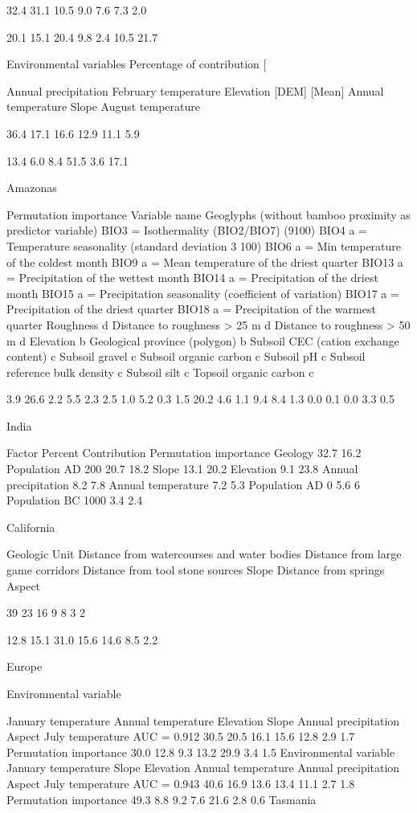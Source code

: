 \documentclass[a4paper,12pt]{scrartcl}
\begin{document}
32.4
31.1
10.5
9.0
7.6
7.3
2.0

20.1
15.1
20.4
9.8
2.4
10.5
21.7

Environmental variables Percentage of contribution [%

Annual precipitation
February temperature
Elevation [DEM]
[Mean] Annual temperature
Slope
August temperature

36.4
17.1
16.6
12.9
11.1
5.9

13.4
6.0
8.4
51.5
3.6
17.1

\cite{mcmichael2014bamboodominated}
Amazonas

Permutation importance
Variable name Geoglyphs (without bamboo proximity as predictor variable)
BIO3 = Isothermality (BIO2/BIO7) (9100)
BIO4 a = Temperature seasonality (standard deviation 3 100)
BIO6 a = Min temperature of the coldest month
BIO9 a = Mean temperature of the driest quarter
BIO13 a = Precipitation of the wettest month
BIO14 a = Precipitation of the driest month
BIO15 a = Precipitation seasonality (coefficient of variation)
BIO17 a = Precipitation of the driest quarter
BIO18 a = Precipitation of the warmest quarter
Roughness d
Distance to roughness > 25 m d
Distance to roughness > 50 m d
Elevation b
Geological province (polygon) b
Subsoil CEC (cation exchange content) c
Subsoil gravel c
Subsoil organic carbon c
Subsoil pH c
Subsoil reference bulk density c
Subsoil silt c
Topsoil organic carbon c

3.9
26.6
2.2
5.5
2.3
2.5
1.0
5.2
0.3
1.5
20.2
4.6
1.1
9.4
8.4
1.3
0.0
0.1
0.0
3.3
0.5

\parencite{gillespie2016predictive}
India

Factor Percent Contribution Permutation importance
Geology 32.7 16.2
Population AD 200 20.7 18.2
Slope 13.1 20.2
Elevation 9.1 23.8
Annual precipitation 8.2 7.8
Annual temperature 7.2 5.3
Population AD 0 5.6 6
Population BC 1000 3.4 2.4

\cite{oyarzun2016predicting}
California

Geologic Unit
Distance from watercourses and water bodies
Distance from large game corridors
Distance from tool stone sources
Slope
Distance from springs
Aspect

39%
23%
16%
9%
8%
3%
2%

12.8
15.1
31.0
15.6
14.6
8.5
2.2

\cite{kondo2018ecological}
Europe

Environmental variable

January temperature
Annual temperature
Elevation
Slope
Annual precipitation
Aspect
July temperature
AUC = 0.912
30.5
20.5
16.1
15.6
12.8
2.9
1.7
Permutation importance
30.0
12.8
9.3
13.2
29.9
3.4
1.5
Environmental variable
January temperature
Slope
Elevation
Annual temperature
Annual precipitation
Aspect
July temperature
AUC = 0.943
40.6
16.9
13.6
13.4
11.1
2.7
1.8
Permutation importance
49.3
8.8
9.2
7.6
21.6
2.8
0.6
\cite{jones2019mapping}
Tasmania
\end{document}
